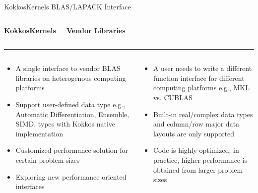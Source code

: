 \begin{frame}[fragile]{KokkosKernels BLAS/LAPACK Interface}

\vspace{-1em}
  \begin{columns}[t,onlytextwidth]
      \begin{center}
        \textbf{KokkosKernels}
      \end{center}
      \begin{center}
        \textbf{Vendor Libraries}
      \end{center}
  \end{columns}

\noindent\rule{4in}{0.4pt}

  \begin{columns}[t,onlytextwidth]
      \begin{flushleft}
      \vspace{-2em}
        \begin{itemize}
          \item \small{A single interface to vendor BLAS libraries on
          heterogenous computing platforms}
          \item \small{Support user-defined data type e.g., Automatic Differentiation,
          Ensemble, SIMD, types with Kokkos native implementation}
          \item \small{Customized performance solution for certain problem sizes}
          \item \small{Exploring new performance oriented interfaces}
        \end{itemize}
      \end{flushleft}
      \begin{flushright}
      \vspace{-2em}
        \begin{itemize}
          \item \small{A user needs to write a different function interface for
          different computing platforms e.g., MKL vs. CUBLAS}
          \item \small{Built-in real/complex data types and column/row major data
          layouts are only supported}
          \item \small{Code is highly optimized; in practice, higher performance is
          obtained from larger problem sizes}
        \end{itemize}
      \end{flushright}
  \end{columns}
\end{frame}


